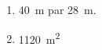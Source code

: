 %
%
    \begin{enumerate}
        \item \SI{40}{m} par \SI{28}{m}.
        \item \SI{1120}{m^2}
    \end{enumerate}
